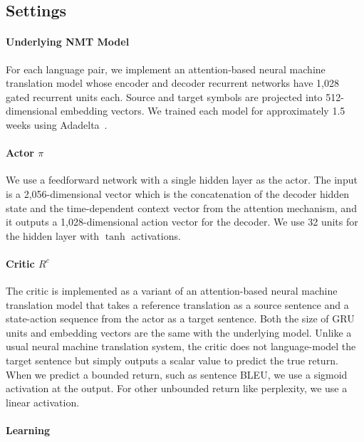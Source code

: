 \subsection{Settings}
\paragraph{Underlying NMT Model} 
For each language pair, we implement an attention-based neural machine translation model whose encoder and decoder recurrent networks have 1,028 gated recurrent units \citep[GRU,][]{cho2014learning} each. Source and target symbols are projected into 512-dimensional embedding vectors. We trained each model for approximately 1.5 weeks using Adadelta~\citep{zeiler2012adadelta}.

\paragraph{Actor $\pi$}
We use a feedforward network with a single hidden layer as the actor. The input is a 2,056-dimensional vector which is the concatenation of the decoder hidden state and the time-dependent context vector from the attention mechanism, and it outputs a 1,028-dimensional action vector for the decoder. We use 32 units for the hidden layer with $\tanh$ activations.
 
\paragraph{Critic $R^c$}

The critic is implemented as a variant of an attention-based neural machine translation model that takes a reference translation as a source sentence and a state-action sequence from the actor as a target sentence. Both the size of GRU units and embedding vectors are the same with the underlying model.  Unlike a usual neural machine translation system, the critic does not language-model the target sentence but simply outputs a scalar value to predict the true return. When we predict a bounded return, such as sentence BLEU, we use a sigmoid activation at the output. For other unbounded return like perplexity, we use a linear activation.
\paragraph{Learning}


